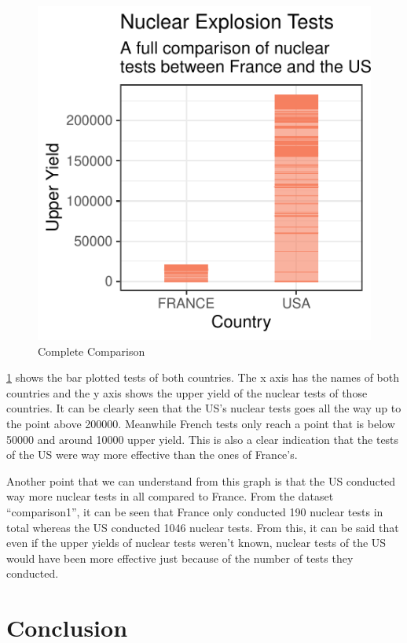 \documentclass[
  12pt,
]{article}
\begin{document}
\newpage
\begin{figure}

{\centering \includegraphics{project_files/figure-latex/plot2-1} 

}

\caption{Complete Comparison}\label{fig:plot2}
\end{figure}

\ref{fig:plot2} shows the bar plotted tests of both countries. The x axis has the names of both countries and the y axis shows the upper yield of the nuclear tests of those countries. It can be clearly seen that the US's nuclear tests goes all the way up to the point above 200000. Meanwhile French tests only reach a point that is below 50000 and around 10000 upper yield. This is also a clear indication that the tests of the US were way more effective than the ones of France's.

Another point that we can understand from this graph is that the US conducted way more nuclear tests in all compared to France. From the dataset ``comparison1'', it can be seen that France only conducted 190 nuclear tests in total whereas the US conducted 1046 nuclear tests. From this, it can be said that even if the upper yields of nuclear tests weren't known, nuclear tests of the US would have been more effective just because of the number of tests they conducted.

\newpage

\hypertarget{conclusion}{%
\section{Conclusion}\label{conclusion}}
\end{document}
